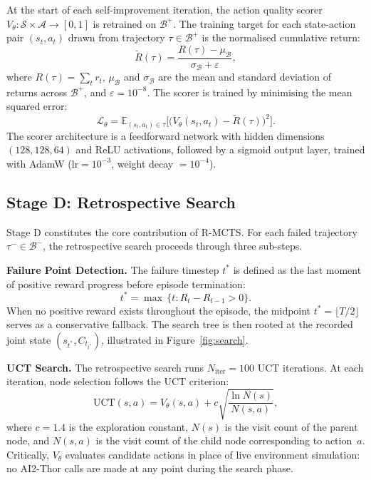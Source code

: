 \documentclass[pdflatex,sn-mathphys-num]{sn-jnl}
\theoremstyle{thmstyleone}
\theoremstyle{thmstyletwo}
\theoremstyle{thmstylethree}
\newcommand{\RMCTS}{\textsc{R-MCTS}}
\newcommand{\Vtheta}{V_{\!\theta}}
\newcommand{\Ct}{C_{t}}
\newcommand{\EE}{\mathbb{E}}
\begin{document}
At the start of each self-improvement iteration, the action quality
scorer $\Vtheta:\mathcal{S}\times\mathcal{A}\rightarrow[0,1]$ is
retrained on $\mathcal{B}^{+}$.
The training target for each state-action pair $(s_t,a_t)$ drawn from
trajectory $\tau\in\mathcal{B}^{+}$ is the normalised cumulative
return:
\begin{equation}\label{eq:normalised_return}
  \tilde{R}(\tau)
  = \frac{R(\tau)-\mu_{\mathcal{B}}}{\sigma_{\mathcal{B}}+\varepsilon},
\end{equation}
where $R(\tau)=\sum_t r_t$, $\mu_{\mathcal{B}}$ and
$\sigma_{\mathcal{B}}$ are the mean and standard deviation of returns
across $\mathcal{B}^{+}$, and $\varepsilon=10^{-8}$.
The scorer is trained by minimising the mean squared error:
\begin{equation}\label{eq:scorer_loss}
  \mathcal{L}_{\theta}
  = \EE_{(s_t,a_t)\in\tau}\!
    \bigl[
      \bigl(\Vtheta(s_t,a_t)-\tilde{R}(\tau)\bigr)^2
    \bigr].
\end{equation}
The scorer architecture is a feedforward network with hidden dimensions
$(128,128,64)$ and ReLU activations, followed by a sigmoid output layer,
trained with AdamW ($\text{lr}=10^{-3}$, weight decay $=10^{-4}$).

\subsection{Stage D: Retrospective Search}\label{sec:staged}

Stage D constitutes the core contribution of \RMCTS{}.
For each failed trajectory $\tau^{-}\in\mathcal{B}^{-}$, the
retrospective search proceeds through three sub-steps.

\textbf{Failure Point Detection.}
The failure timestep $t^*$ is defined as the last moment of positive
reward progress before episode termination:
\begin{equation}\label{eq:failure_point}
  t^* = \max\,\bigl\{t:R_t-R_{t-1}>0\bigr\}.
\end{equation}
When no positive reward exists throughout the episode, the midpoint
$t^*=\lfloor T/2\rfloor$ serves as a conservative fallback.
The search tree is then rooted at the recorded joint state
$(s_{t^*},\Ct_{t^*})$, illustrated in Figure~\ref{fig:search}.

\textbf{UCT Search.}
The retrospective search runs $N_{\mathrm{iter}}=100$ UCT iterations.
At each iteration, node selection follows the UCT criterion:
\begin{equation}\label{eq:uct}
  \mathrm{UCT}(s,a)
  = \Vtheta(s,a)
    + c\sqrt{\frac{\ln N(s)}{N(s,a)}},
\end{equation}
where $c=1.4$ is the exploration constant, $N(s)$ is the visit count
of the parent node, and $N(s,a)$ is the visit count of the child node
corresponding to action~$a$.
Critically, $\Vtheta$ evaluates candidate actions in place of live
environment simulation: no AI2-Thor calls are made at any point during
the search phase.
\end{document}
